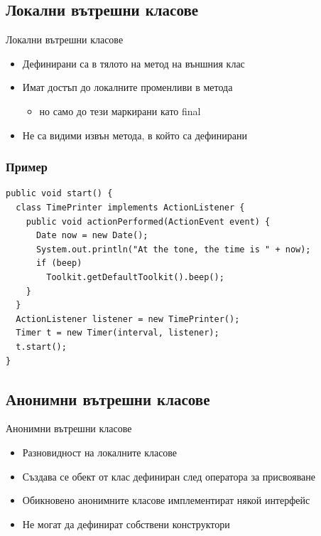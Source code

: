 \documentclass{beamer}
\begin{document}
\subsection{Локални вътрешни класове}
\begin{frame}{Локални вътрешни класове}
  \transdissolve
  \begin{itemize}
  \item Дефинирани са в тялото на метод на външния клас \pause
  \item Имат достъп до локалните променливи в метода \pause
    \begin{itemize}
      \item но само до тези маркирани като final \pause
    \end{itemize}
  \item Не са видими извън метода, в който са дефинирани
  \end{itemize}
\end{frame}

\begin{frame}[fragile]
  \frametitle{Пример}
  \transdissolve
\begin{lstlisting}[basicstyle=\small]
public void start() {
  class TimePrinter implements ActionListener {
    public void actionPerformed(ActionEvent event) {
      Date now = new Date();
      System.out.println("At the tone, the time is " + now);
      if (beep) 
        Toolkit.getDefaultToolkit().beep();
    }
  }
  ActionListener listener = new TimePrinter();
  Timer t = new Timer(interval, listener);
  t.start();
}  
\end{lstlisting}
\end{frame}

\subsection{Анонимни вътрешни класове}
\begin{frame}{Анонимни вътрешни класове}
  \transdissolve
  \begin{itemize}
  \item Разновидност на локалните класове \pause
  \item Създава се обект от клас дефиниран след оператора за
    присвояване \pause
  \item Обикновено анонимните класове имплементират някой интерфейс
    \pause
  \item Не могат да дефинират собствени конструктори
  \end{itemize}
\end{frame}
\end{document}
